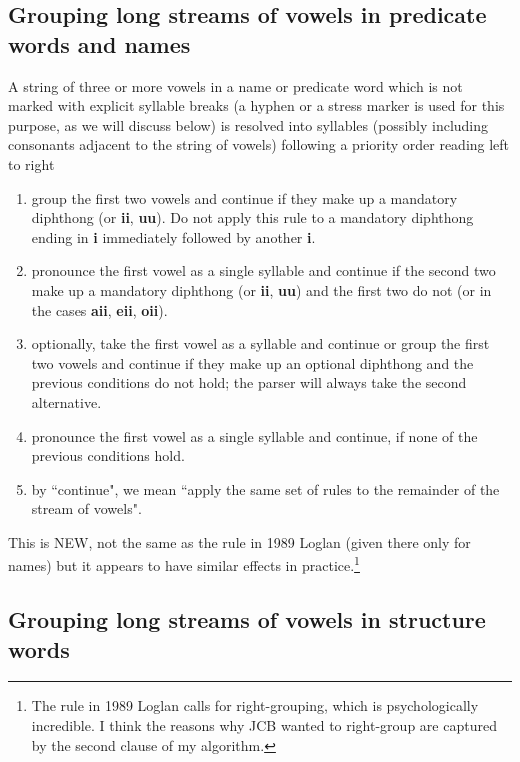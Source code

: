 \documentclass[12pt]{book}
\begin{document}
\subsection{Grouping long streams of vowels in predicate words and names}

A string of three or more vowels  in a name or predicate word which is not marked with explicit syllable breaks (a hyphen or a stress marker is used for this purpose, as we will discuss below) is resolved into syllables (possibly including consonants adjacent to the string of vowels)  following a priority order reading left to right  

\begin{enumerate}

\item group the first two vowels and continue if they make up a mandatory diphthong (or {\bf ii}, {\bf uu}).  Do not apply this rule to a mandatory diphthong ending in {\bf i} immediately followed by another {\bf i}.

\item pronounce the first vowel as a single syllable and continue if the second two make up a mandatory diphthong (or {\bf ii}, {\bf uu})  and the first two do not (or in the cases {\bf aii}, {\bf eii}, {\bf oii}).

\item optionally, take the first vowel as a syllable and continue or group the first two vowels and continue if they make up an optional diphthong and the previous conditions do
 not hold; the parser will always take the second alternative.

\item  pronounce the first vowel as a single syllable and continue, if none of the previous conditions hold.

\item  by ``continue", we mean ``apply the same set of rules to the remainder of the stream of vowels".

\end{enumerate}

This is NEW, not the same as the rule in 1989 Loglan (given there only for names) but it appears to have similar effects in practice.\footnote{The rule in 1989 Loglan calls for right-grouping, which is psychologically incredible.  I think the reasons why JCB wanted to right-group are captured by the second clause of my algorithm.}

\subsection{Grouping long streams of vowels in structure words}
\end{document}
